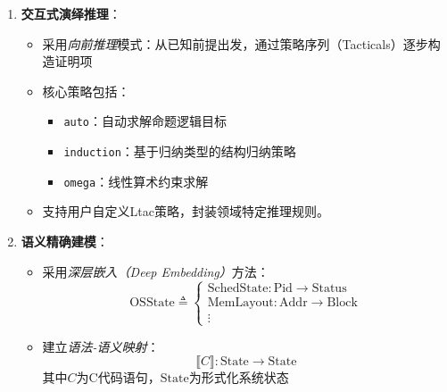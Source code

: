 \begin{enumerate}[leftmargin=*,label=\textbf{\arabic*}.]
    \item \textbf{交互式演绎推理}：
    \begin{itemize}
        \item 采用\emph{向前推理}模式：从已知前提出发，通过策略序列（Tacticals）逐步构造证明项
        \item 核心策略包括：
            \begin{itemize}
                \item \texttt{auto}：自动求解命题逻辑目标
                \item \texttt{induction}：基于归纳类型的结构归纳策略
                \item \texttt{omega}：线性算术约束求解
            \end{itemize}
        \item 支持用户自定义Ltac策略，封装领域特定推理规则。
    \end{itemize}

    \item \textbf{语义精确建模}：
    \begin{itemize}
        \item 采用\emph{深层嵌入（Deep Embedding）}方法：
            \begin{equation}
                \mathrm{OSState} \triangleq 
                \begin{cases}
                    \mathrm{SchedState} : \mathrm{Pid} \to \mathrm{Status} \\
                    \mathrm{MemLayout} : \mathrm{Addr} \to \mathrm{Block} \\
                    \vdots
                \end{cases}
            \end{equation}
        \item 建立\emph{语法-语义映射}：
            \begin{equation}
                \llbracket C \rrbracket : \mathrm{State} \to \mathrm{State}
            \end{equation}
            其中$C$为C代码语句，$\mathrm{State}$为形式化系统状态
    \end{itemize}


\end{enumerate}
